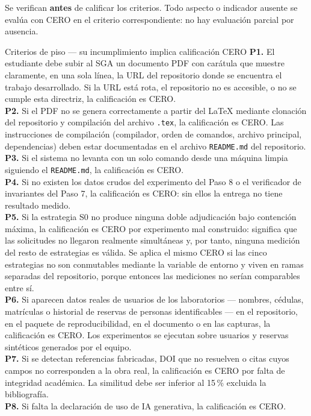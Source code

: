 \documentclass[11pt,a4paper]{article}
\begin{document}
	Se verifican \textbf{antes} de calificar los criterios. Todo aspecto o indicador ausente se evalúa con CERO en el criterio correspondiente: no hay evaluación parcial por ausencia.
	
	\begin{pisoBox}{Criterios de piso --- su incumplimiento implica calificación CERO}
		\textbf{P1.} El estudiante debe subir al SGA un documento PDF con carátula que muestre claramente, en una sola línea, la URL del repositorio donde se encuentra el trabajo desarrollado. Si la URL está rota, el repositorio no es accesible, o no se cumple esta directriz, la calificación es CERO.\\[5pt]
		\textbf{P2.} Si el PDF no se genera correctamente a partir del LaTeX mediante clonación del repositorio y compilación del archivo \texttt{.tex}, la calificación es CERO. Las instrucciones de compilación (compilador, orden de comandos, archivo principal, dependencias) deben estar documentadas en el archivo \texttt{README.md} del repositorio.\\[5pt]
		\textbf{P3.} Si el sistema no levanta con un solo comando desde una máquina limpia siguiendo el \texttt{README.md}, la calificación es CERO.\\[5pt]
		\textbf{P4.} Si no existen los datos crudos del experimento del Paso 8 o el verificador de invariantes del Paso 7, la calificación es CERO: sin ellos la entrega no tiene resultado medido.\\[5pt]
		\textbf{P5.} Si la estrategia S0 no produce ninguna doble adjudicación bajo contención máxima, la calificación es CERO por experimento mal construido: significa que las solicitudes no llegaron realmente simultáneas y, por tanto, ninguna medición del resto de estrategias es válida. Se aplica el mismo CERO si las cinco estrategias no son conmutables mediante la variable de entorno y viven en ramas separadas del repositorio, porque entonces las mediciones no serían comparables entre sí.\\[5pt]
		\textbf{P6.} Si aparecen datos reales de usuarios de los laboratorios --- nombres, cédulas, matrículas o historial de reservas de personas identificables --- en el repositorio, en el paquete de reproducibilidad, en el documento o en las capturas, la calificación es CERO. Los experimentos se ejecutan sobre usuarios y reservas sintéticos generados por el equipo.\\[5pt]
		\textbf{P7.} Si se detectan referencias fabricadas, DOI que no resuelven o citas cuyos campos no corresponden a la obra real, la calificación es CERO por falta de integridad académica. La similitud debe ser inferior al 15\,\% excluida la bibliografía.\\[5pt]
		\textbf{P8.} Si falta la declaración de uso de IA generativa, la calificación es CERO.
	\end{pisoBox}
	
\end{document}
